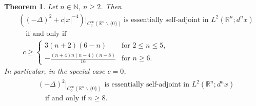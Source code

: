 \documentclass[reqno,11pt,centertags]{amsart}
\newcommand{\bbN}{{\mathbb{N}}}
\newcommand{\bbR}{{\mathbb{R}}}
\newcommand{\<}{\langle}
\renewcommand{\>}{\rangle}
\newcommand{\no}{\nonumber}
\newcommand{\lb}{\label}
\numberwithin{equation}{section}
\newtheorem{theorem}{Theorem}[section]
\theoremstyle{definition}
\begin{document}
\begin{theorem} \lb{t3.2}
Let  $n\in \bbN$, $n\geq 2$. Then 
\begin{align}
& \left((-\Delta)^2 +c|x|^{-4}\right)\big|_{C_0^{\infty}(\bbR^n \backslash \{0\})}\ \mbox{is essentially self-adjoint  in $L^2(\bbR^n; d^n x)$}     \no \\
& \quad \text{if and only if}     \lb{E:condition} \\ 
& \;\; c\geq \begin{cases}
3(n+2)(6-n) & \mbox{for $2\leq n\leq 5$},   \\[10pt]
{\displaystyle -\frac{(n+4)n(n-4)(n-8)}{16}}& \mbox{for $n\geq 6$}.    
\end{cases}     \no
\end{align}
In particular, in the special case $c=0$, 
\begin{align}
\begin{split} 
& \text{$(- \Delta)^2\big|_{C_0^{\infty}(\bbR^n \backslash \{0\})}$ is essentially self-adjoint in $L^2(\bbR^n; d^n x)$}  \\
& \quad \text{if and only if $n \geq 8$.}
\end{split}
\end{align}  
\end{theorem}
\end{document}
